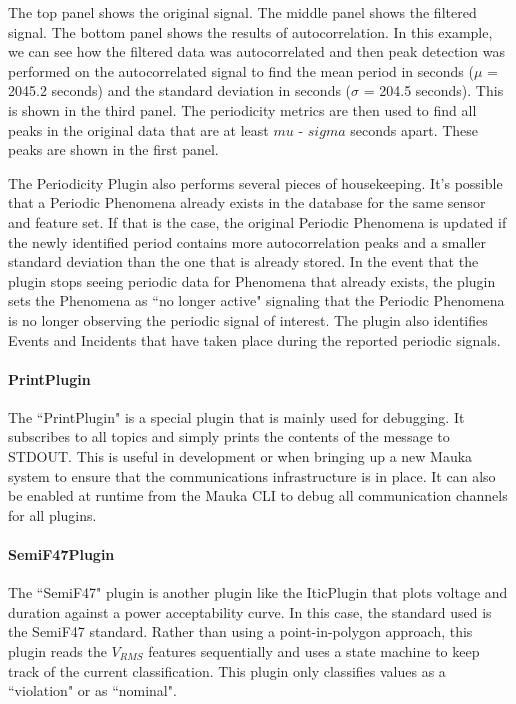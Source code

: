The top panel shows the original signal. The middle panel shows the filtered signal. The bottom panel shows the results of autocorrelation. In this example, we can see how the filtered data was autocorrelated and then peak detection was performed on the autocorrelated signal to find the mean period in seconds ($\mu$ = 2045.2 seconds) and the standard deviation in seconds ($\sigma$ = 204.5 seconds). This is shown in the third panel. The periodicity metrics are then used to find all peaks in the original data that are at least $mu$ - $sigma$ seconds apart. These peaks are shown in the first panel.

The Periodicity Plugin also performs several pieces of housekeeping. It's possible that a Periodic Phenomena already exists in the database for the same sensor and feature set. If that is the case, the original Periodic Phenomena is updated if the newly identified period contains more autocorrelation peaks and a smaller standard deviation than the one that is already stored. In the event that the plugin stops seeing periodic data for Phenomena that already exists, the plugin sets the Phenomena as ``no longer active" signaling that the Periodic Phenomena is no longer observing the periodic signal of interest. The plugin also identifies Events and Incidents that have taken place during the reported periodic signals.

\paragraph{PrintPlugin}
The ``PrintPlugin" is a special plugin that is mainly used for debugging. It subscribes to all topics and simply prints the contents of the message to STDOUT. This is useful in development or when bringing up a new Mauka system to ensure that the communications infrastructure is in place. It can also be enabled at runtime from the Mauka CLI to debug all communication channels for all plugins.

\paragraph{SemiF47Plugin}
The ``SemiF47" plugin is another plugin like the IticPlugin that plots voltage and duration against a power acceptability curve. In this case, the standard used is the SemiF47 standard\cite{semif47}. Rather than using a point-in-polygon approach, this plugin reads the $V_{RMS}$ features sequentially and uses a state machine to keep track of the current classification. This plugin only classifies values as a ``violation" or as ``nominal".

